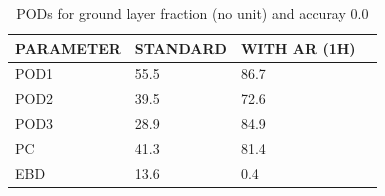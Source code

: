 \begin{table}[]
\begin{center}
\begin{tabular}{|l|l|l|l|}
\hline
\multicolumn{1}{|c|}{\cellcolor[HTML]{C0C0C0}\textbf{PARAMETER}} & \multicolumn{1}{c|}{\cellcolor[HTML]{C0C0C0}\textbf{STANDARD}} & \multicolumn{1}{c|}{\cellcolor[HTML]{C0C0C0}\textbf{WITH AR (1H)}} \\
\hline
\cellcolor[HTML]{C0C0C0}POD1  & 55.5                                & 86.7         \\
\cellcolor[HTML]{C0C0C0}POD2  & 39.5                                & 72.6         \\
\cellcolor[HTML]{C0C0C0}POD3  & 28.9                                & 84.9         \\
\cellcolor[HTML]{C0C0C0}PC    & 41.3                                  & 81.4           \\
\cellcolor[HTML]{C0C0C0}EBD   & 13.6                                 & 0.4          \\
\hline
\end{tabular}
\caption{PODs for ground layer fraction (no unit) and accuray 0.0}
\end{center}
\end{table}
